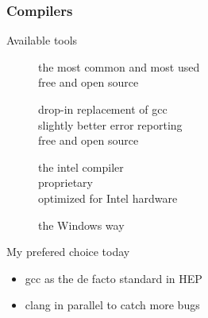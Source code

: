 \begin{frame}[fragile]
  \frametitle{Compilers}
  \begin{block}{Available tools}
    \begin{description}
    \item[\href{http://gcc.gnu.org/}{}]
        the most common and most used\\
        free and open source
    \item[\href{http://clang.llvm.org/}{}]
        drop-in replacement of gcc \\
        slightly better error reporting \\
        free and open source
    \item[\href{http://software.intel.com/en-us/intel-compilers}{}]
        the intel compiler \\
        proprietary \\
        optimized for Intel hardware
    \item[\href{http://www.microsoft.com/}{}]
      the Windows way
    \end{description}
  \end{block}
  \begin{alertblock}{My prefered choice today}
    \begin{itemize}
      \item \alert{gcc} as the de facto standard in HEP
      \item \hspace{0pt}\alert{clang} in parallel to catch more bugs
    \end{itemize}
  \end{alertblock}
\end{frame}

